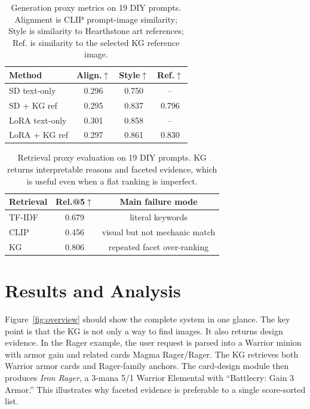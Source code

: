 \documentclass[10pt,twocolumn,letterpaper]{article}
\begin{document}
\begin{table}[t]
\centering
\small
\begin{tabular}{lccc}
\toprule
\textbf{Method} & \textbf{Align.}$\uparrow$ & \textbf{Style}$\uparrow$ & \textbf{Ref.}$\uparrow$ \\
\midrule
SD text-only & 0.296 & 0.750 & -- \\
SD + KG ref & 0.295 & 0.837 & 0.796 \\
LoRA text-only & 0.301 & 0.858 & -- \\
LoRA + KG ref & 0.297 & 0.861 & 0.830 \\
\bottomrule
\end{tabular}
\caption{Generation proxy metrics on 19 DIY prompts. Alignment is CLIP prompt-image similarity; Style is similarity to Hearthstone art references; Ref. is similarity to the selected KG reference image.}
\label{tab:generation}
\end{table}

\begin{table}[t]
\centering
\small
\begin{tabular}{lcc}
\toprule
\textbf{Retrieval} & \textbf{Rel.@5}$\uparrow$ & \textbf{Main failure mode} \\
\midrule
TF-IDF & 0.679 & literal keywords \\
CLIP & 0.456 & visual but not mechanic match \\
KG & 0.806 & repeated facet over-ranking \\
\bottomrule
\end{tabular}
\caption{Retrieval proxy evaluation on 19 DIY prompts. KG returns interpretable reasons and faceted evidence, which is useful even when a flat ranking is imperfect.}
\label{tab:retrieval}
\end{table}

\section{Results and Analysis}

Figure~\ref{fig:overview} should show the complete system in one glance. The key point is that the KG is not only a way to find images. It also returns design evidence. In the Rager example, the user request is parsed into a Warrior minion with armor gain and related cards Magma Rager/Rager. The KG retrieves both Warrior armor cards and Rager-family anchors. The card-design module then produces \textit{Iron Rager}, a 3-mana 5/1 Warrior Elemental with ``Battlecry: Gain 3 Armor.'' This illustrates why faceted evidence is preferable to a single score-sorted list.
\end{document}

